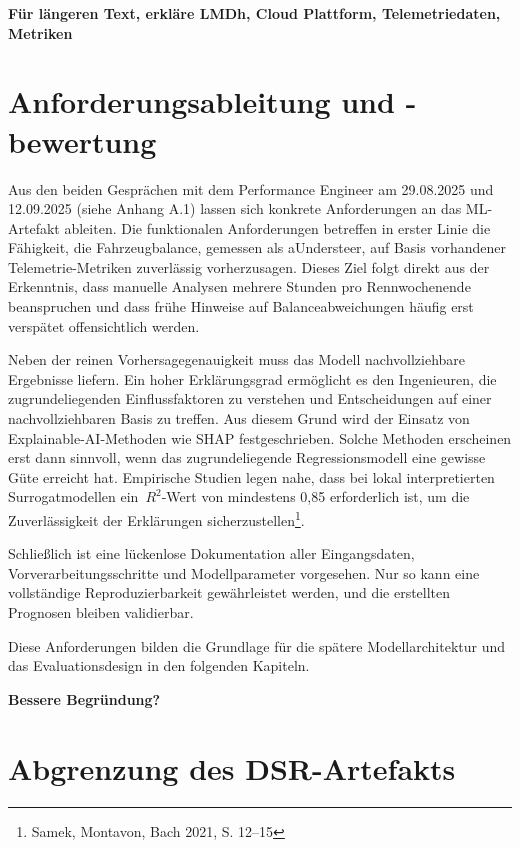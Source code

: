 \textbf{Für längeren Text, erkläre LMDh, Cloud Plattform, Telemetriedaten, Metriken}

\section{Anforderungsableitung und -bewertung}


Aus den beiden Gesprächen mit dem Performance Engineer am 29.08.2025 und 12.09.2025 (siehe Anhang A.1) lassen sich konkrete Anforderungen an das ML-Artefakt ableiten. Die funktionalen Anforderungen betreffen in erster Linie die Fähigkeit, die Fahrzeugbalance, gemessen als aUndersteer, auf Basis vorhandener Telemetrie-Metriken zuverlässig vorherzusagen. Dieses Ziel folgt direkt aus der Erkenntnis, dass manuelle Analysen mehrere Stunden pro Rennwochenende beanspruchen und dass frühe Hinweise auf Balanceabweichungen häufig erst verspätet offensichtlich werden.

Neben der reinen Vorhersagegenauigkeit muss das Modell nachvollziehbare Ergebnisse liefern. Ein hoher Erklärungsgrad ermöglicht es den Ingenieuren, die zugrundeliegenden Einflussfaktoren zu verstehen und Entscheidungen auf einer nachvollziehbaren Basis zu treffen. Aus diesem Grund wird der Einsatz von Explainable-AI-Methoden wie SHAP festgeschrieben. Solche Methoden erscheinen erst dann sinnvoll, wenn das zugrundeliegende Regressionsmodell eine gewisse Güte erreicht hat. Empirische Studien legen nahe, dass bei lokal interpretierten Surrogatmodellen ein \(\,R^2\)-Wert von mindestens 0,85 erforderlich ist, um die Zuverlässigkeit der Erklärungen sicherzustellen\footnote{Samek, Montavon, Bach 2021, S. 12–15}.

Schließlich ist eine lückenlose Dokumentation aller Eingangsdaten, Vorverarbeitungs­schritte und Modellparameter vorgesehen. Nur so kann eine vollständige Reproduzierbarkeit gewährleistet werden, und die erstellten Prognosen bleiben validierbar.

Diese Anforderungen bilden die Grundlage für die spätere Modellarchitektur und das Evaluationsdesign in den folgenden Kapiteln.

\textbf{Bessere Begründung?}

\section{Abgrenzung des DSR-Artefakts}